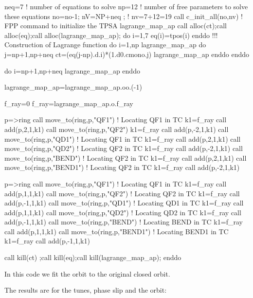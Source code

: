 \documentclass{hitec}     %
\begin{document}
{{\begin{code}
neq=7    ! number of equations to solve
np=12     ! number of free parameters to solve these equations
no=no-1; nV=NP+neq ;  ! nv=7+12=19
call c_init_all(no,nv)   ! FPP command to initialize the TPSA
lagrange_map_ap%
call alloc(ct);call alloc(eq);call alloc(lagrange_map_ap);
do i=1,7
 eq(i)=tpos(i)
enddo
!!!  Construction of Lagrange function
do i=1,np
 lagrange_map_ap%
 do j=np+1,np+neq 
  ct=(eq(j-np).d.i)*(1.d0.cmono.j)
   lagrange_map_ap%
 enddo         
enddo 
 
do i=np+1,np+neq 
 lagrange_map_ap%
enddo 

lagrange_map_ap=lagrange_map_ap.oo.(-1)

f_ray=0
f_ray=lagrange_map_ap.o.f_ray

p=>ring%
call move_to(ring,p,"QF1")   !  Locating QF1 in TC
 k1=f_ray%
 call add(p,2,1,k1)
call move_to(ring,p,"QF2") 
 k1=f_ray%
 call add(p,-2,1,k1)
call move_to(ring,p,"QD1")   !  Locating QF1 in TC
 k1=f_ray%
 call add(p,2,1,k1)
call move_to(ring,p,"QD2")   !  Locating QF2 in TC
 k1=f_ray%
 call add(p,-2,1,k1)
call move_to(ring,p,"BEND")   !  Locating QF2 in TC
 k1=f_ray%
 call add(p,2,1,k1)
call move_to(ring,p,"BEND1")   !  Locating QF2 in TC
 k1=f_ray%
 call add(p,-2,1,k1)

p=>ring%
call move_to(ring,p,"QF1")   !  Locating QF1 in TC
 k1=f_ray%
 call add(p,1,1,k1)
call move_to(ring,p,"QF2")   ! Locating QF2 in TC
 k1=f_ray%
 call add(p,-1,1,k1)
call move_to(ring,p,"QD1")     !  Locating QD1 in TC
 k1=f_ray%
 call add(p,1,1,k1)
call move_to(ring,p,"QD2")     !  Locating QD2 in TC
 k1=f_ray%
 call add(p,-1,1,k1)
call move_to(ring,p,"BEND")     !  Locating BEND in TC
 k1=f_ray%
 call add(p,1,1,k1)
call move_to(ring,p,"BEND1")    !  Locating BEND1 in TC
 k1=f_ray%
 call add(p,-1,1,k1)

call kill(ct) ;call kill(eq);call kill(lagrange_map_ap);
enddo
\end{code}
\renewcommand{\codefont}{\small}

In this code we fit the orbit to the original closed orbit. 

The results are for the tunes, phase slip and the orbit:

}}
\end{document}
